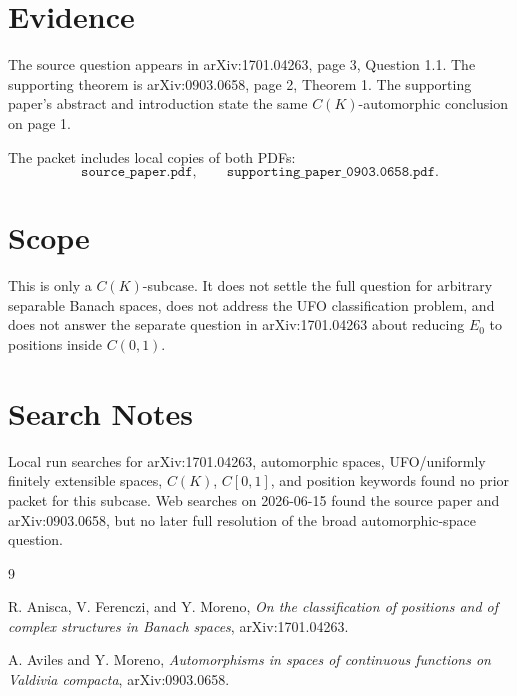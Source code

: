 \documentclass[11pt]{article}
\begin{document}
\section*{Evidence}

The source question appears in arXiv:1701.04263, page 3, Question 1.1.
The supporting theorem is arXiv:0903.0658, page 2, Theorem 1. The supporting
paper's abstract and introduction state the same \(C(K)\)-automorphic
conclusion on page 1.

The packet includes local copies of both PDFs:
\[
\texttt{source\_paper.pdf}, \qquad
\texttt{supporting\_paper\_0903.0658.pdf}.
\]

\section*{Scope}

This is only a \(C(K)\)-subcase. It does not settle the full question for
arbitrary separable Banach spaces, does not address the UFO classification
problem, and does not answer the separate question in arXiv:1701.04263 about
reducing \(E_0\) to positions inside \(C(0,1)\).

\section*{Search Notes}

Local run searches for arXiv:1701.04263, automorphic spaces, UFO/uniformly
finitely extensible spaces, \(C(K)\), \(C[0,1]\), and position keywords found
no prior packet for this subcase. Web searches on 2026-06-15 found the source
paper and arXiv:0903.0658, but no later full resolution of the broad
automorphic-space question.

\begin{thebibliography}{9}

R. Anisca, V. Ferenczi, and Y. Moreno,
\emph{On the classification of positions and of complex structures in Banach spaces},
arXiv:1701.04263.

A. Aviles and Y. Moreno,
\emph{Automorphisms in spaces of continuous functions on Valdivia compacta},
arXiv:0903.0658.

\end{thebibliography}
\end{document}
